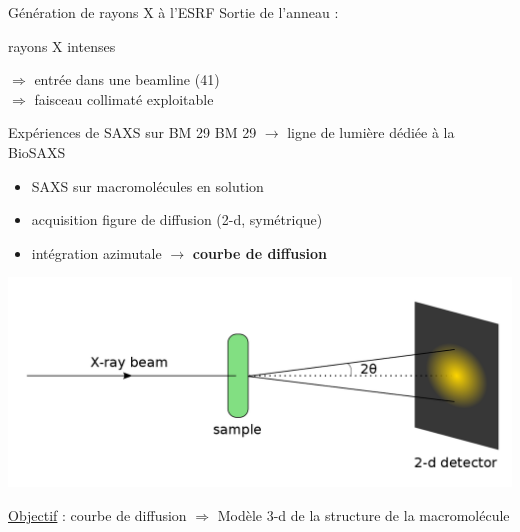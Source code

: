 \documentclass{beamer}
\begin{document}
\begin{frame}{G\'en\'eration de rayons X \`a l'ESRF}
Sortie de l'anneau :\\
\begin{minipage}{0.45\linewidth}
    \begin{center}
    \vspace{-0.8cm}
    rayons X intenses\\
    \end{center}
\end{minipage}
\begin{minipage}{0.50\linewidth}
    $\Rightarrow$ entr\'ee dans une beamline (41)\\
    $\Rightarrow$ faisceau collimat\'e exploitable\\
\end{minipage}
\end{frame}

\begin{frame}{Exp\'eriences de SAXS sur BM 29}
BM 29 $\rightarrow$ ligne de lumi\`ere d\'edi\'ee \`a la BioSAXS\\
\begin{itemize}
  \item SAXS sur macromol\'ecules en solution
  \item acquisition figure de diffusion (2-d, sym\'etrique)
  \item int\'egration azimutale $\rightarrow$ \textbf{courbe de diffusion}
\end{itemize}

\begin{minipage}{\linewidth}
    \begin{flushleft}
    \includegraphics[scale=0.2]{schemaSAXS.png}
    \end{flushleft}
\end{minipage}

\underline{Objectif} : courbe de diffusion $\Rightarrow$ Mod\`ele 3-d 
de la structure de la macromol\'ecule
\end{frame}
\end{document}
